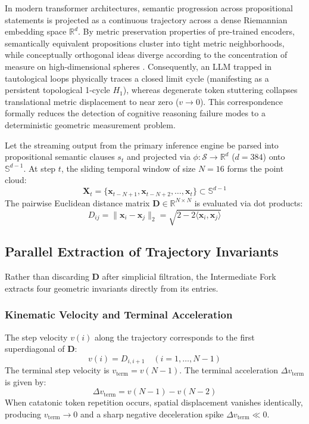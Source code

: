 \documentclass[11pt,a4paper]{article}
\begin{document}
In modern transformer architectures, semantic progression across propositional statements is projected as a continuous trajectory across a dense Riemannian embedding space $\mathbb{R}^d$. By metric preservation properties of pre-trained encoders, semantically equivalent propositions cluster into tight metric neighborhoods, while conceptually orthogonal ideas diverge according to the concentration of measure on high-dimensional spheres \cite{edelsbrunner2010computational}. Consequently, an LLM trapped in tautological loops physically traces a closed limit cycle (manifesting as a persistent topological 1-cycle $H_1$), whereas degenerate token stuttering collapses translational metric displacement to near zero ($v \to 0$). This correspondence formally reduces the detection of cognitive reasoning failure modes to a deterministic geometric measurement problem.

Let the streaming output from the primary inference engine be parsed into propositional semantic clauses $s_t$ and projected via $\phi: \mathcal{S} \to \mathbb{R}^d$ ($d=384$) onto $\mathbb{S}^{d-1}$. At step $t$, the sliding temporal window of size $N=16$ forms the point cloud:
\begin{equation}
\mathbf{X}_t = \{\mathbf{x}_{t-N+1}, \mathbf{x}_{t-N+2}, \dots, \mathbf{x}_t\} \subset \mathbb{S}^{d-1}
\end{equation}
The pairwise Euclidean distance matrix $\mathbf{D} \in \mathbb{R}^{N \times N}$ is evaluated via dot products:
\begin{equation}
D_{ij} = \|\mathbf{x}_i - \mathbf{x}_j\|_2 = \sqrt{2 - 2 \langle \mathbf{x}_i, \mathbf{x}_j \rangle}
\end{equation}

\subsection{Parallel Extraction of Trajectory Invariants}

Rather than discarding $\mathbf{D}$ after simplicial filtration, the Intermediate Fork extracts four geometric invariants directly from its entries.

\subsubsection{Kinematic Velocity and Terminal Acceleration}
The step velocity $v(i)$ along the trajectory corresponds to the first superdiagonal of $\mathbf{D}$:
\begin{equation}
v(i) = D_{i, i+1} \quad (i = 1, \dots, N-1)
\end{equation}
The terminal step velocity is $v_{\mathrm{term}} = v(N-1)$. The terminal acceleration $\Delta v_{\mathrm{term}}$ is given by:
\begin{equation}
\Delta v_{\mathrm{term}} = v(N-1) - v(N-2)
\end{equation}
When catatonic token repetition occurs, spatial displacement vanishes identically, producing $v_{\mathrm{term}} \to 0$ and a sharp negative deceleration spike $\Delta v_{\mathrm{term}} \ll 0$.
\end{document}
